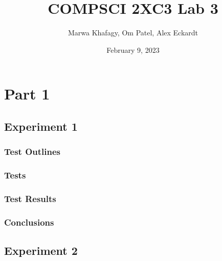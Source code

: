 \documentclass[12pt]{article}
\title{COMPSCI 2XC3 Lab 3}
\author{Marwa Khafagy, Om Patel, Alex Eckardt}
\date{February 9, 2023}
\begin{document}
\maketitle

\newpage
\tableofcontents

\newpage
\listoffigures


%
%
%
%
\newpage
\section{Part 1}
\subsection{Experiment 1}
\subsubsection{Test Outlines}



\subsubsection{Tests}
\subsubsection{Test Results}
\subsubsection{Conclusions}

%
%
%
%
\newpage
\subsection{Experiment 2}

%
%
%
%
\newpage
\end{document}
